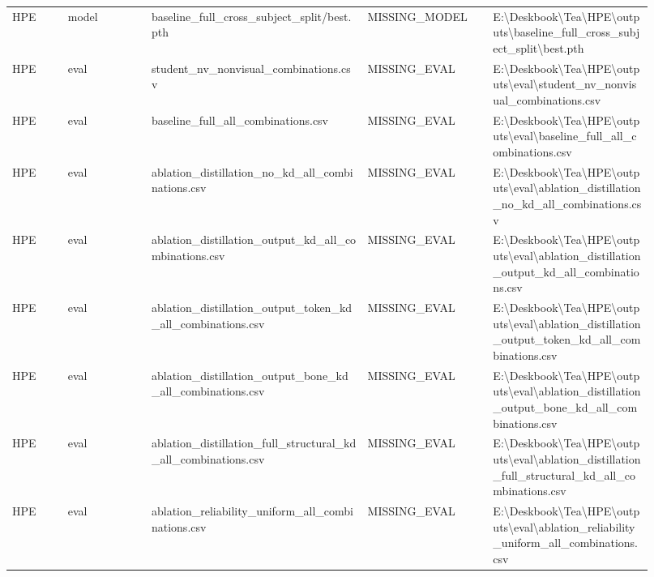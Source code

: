 \begin{longtable}{p{0.08\linewidth}p{0.12\linewidth}p{0.31\linewidth}p{0.18\linewidth}p{0.23\linewidth}}
HPE & model & baseline\_full\_cross\_subject\_split/best.pth & MISSING\_MODEL & \scriptsize E:\textbackslash{}Deskbook\textbackslash{}Tea\textbackslash{}HPE\textbackslash{}outputs\textbackslash{}baseline\_full\_cross\_subject\_split\textbackslash{}best.pth\\
HPE & eval & student\_nv\_nonvisual\_combinations.csv & MISSING\_EVAL & \scriptsize E:\textbackslash{}Deskbook\textbackslash{}Tea\textbackslash{}HPE\textbackslash{}outputs\textbackslash{}eval\textbackslash{}student\_nv\_nonvisual\_combinations.csv\\
HPE & eval & baseline\_full\_all\_combinations.csv & MISSING\_EVAL & \scriptsize E:\textbackslash{}Deskbook\textbackslash{}Tea\textbackslash{}HPE\textbackslash{}outputs\textbackslash{}eval\textbackslash{}baseline\_full\_all\_combinations.csv\\
HPE & eval & ablation\_distillation\_no\_kd\_all\_combinations.csv & MISSING\_EVAL & \scriptsize E:\textbackslash{}Deskbook\textbackslash{}Tea\textbackslash{}HPE\textbackslash{}outputs\textbackslash{}eval\textbackslash{}ablation\_distillation\_no\_kd\_all\_combinations.csv\\
HPE & eval & ablation\_distillation\_output\_kd\_all\_combinations.csv & MISSING\_EVAL & \scriptsize E:\textbackslash{}Deskbook\textbackslash{}Tea\textbackslash{}HPE\textbackslash{}outputs\textbackslash{}eval\textbackslash{}ablation\_distillation\_output\_kd\_all\_combinations.csv\\
HPE & eval & ablation\_distillation\_output\_token\_kd\_all\_combinations.csv & MISSING\_EVAL & \scriptsize E:\textbackslash{}Deskbook\textbackslash{}Tea\textbackslash{}HPE\textbackslash{}outputs\textbackslash{}eval\textbackslash{}ablation\_distillation\_output\_token\_kd\_all\_combinations.csv\\
HPE & eval & ablation\_distillation\_output\_bone\_kd\_all\_combinations.csv & MISSING\_EVAL & \scriptsize E:\textbackslash{}Deskbook\textbackslash{}Tea\textbackslash{}HPE\textbackslash{}outputs\textbackslash{}eval\textbackslash{}ablation\_distillation\_output\_bone\_kd\_all\_combinations.csv\\
HPE & eval & ablation\_distillation\_full\_structural\_kd\_all\_combinations.csv & MISSING\_EVAL & \scriptsize E:\textbackslash{}Deskbook\textbackslash{}Tea\textbackslash{}HPE\textbackslash{}outputs\textbackslash{}eval\textbackslash{}ablation\_distillation\_full\_structural\_kd\_all\_combinations.csv\\
HPE & eval & ablation\_reliability\_uniform\_all\_combinations.csv & MISSING\_EVAL & \scriptsize E:\textbackslash{}Deskbook\textbackslash{}Tea\textbackslash{}HPE\textbackslash{}outputs\textbackslash{}eval\textbackslash{}ablation\_reliability\_uniform\_all\_combinations.csv\\

\end{longtable}
